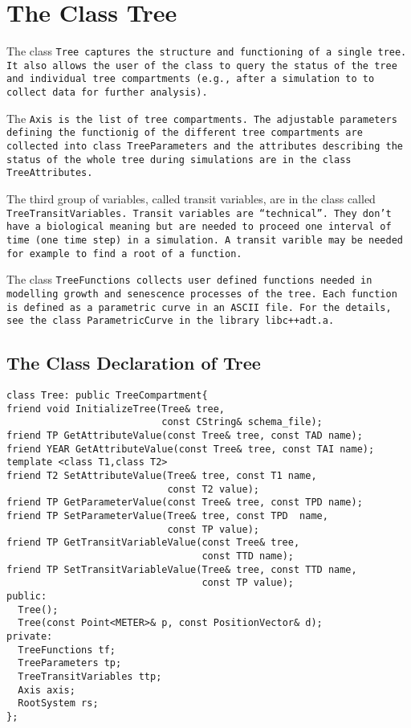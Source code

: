 \section{The Class Tree}

The class \tt Tree \rm captures the structure and 
functioning of a single tree. It also allows the user of the class
to query the status of the tree and individual tree
compartments (e.g., after a simulation to to collect data 
for further analysis).

The \tt Axis \rm is the list of tree compartments. 
The adjustable parameters defining the functionig of the different  
tree compartments are collected into  class \tt TreeParameters \rm 
and the attributes describing the status of the whole  tree 
during simulations are in the class \tt TreeAttributes\rm. 

The third group of variables, called transit
variables, are in the class called \tt TreeTransitVariables\rm. 
Transit variables are ``technical''. They don't have a
biological meaning but are needed to proceed one interval of time
(one time step) in a simulation. A transit varible may be needed
for example to find a root of a function.

The class \tt TreeFunctions \rm collects user defined functions needed
in modelling growth and senescence processes of the tree. Each
function is defined as a parametric curve in an ASCII file. 
For the details, see the class \tt ParametricCurve \rm in the library 
\tt libc++adt.a\rm.

\subsection{The Class Declaration of Tree}
\begin{verbatim}
class Tree: public TreeCompartment{
friend void InitializeTree(Tree& tree, 
                           const CString& schema_file);
friend TP GetAttributeValue(const Tree& tree, const TAD name);
friend YEAR GetAttributeValue(const Tree& tree, const TAI name);
template <class T1,class T2>
friend T2 SetAttributeValue(Tree& tree, const T1 name, 
                            const T2 value);
friend TP GetParameterValue(const Tree& tree, const TPD name);
friend TP SetParameterValue(Tree& tree, const TPD  name, 
                            const TP value);
friend TP GetTransitVariableValue(const Tree& tree, 
                                  const TTD name);
friend TP SetTransitVariableValue(Tree& tree, const TTD name, 
                                  const TP value);
public:
  Tree();
  Tree(const Point<METER>& p, const PositionVector& d);
private:
  TreeFunctions tf;
  TreeParameters tp;
  TreeTransitVariables ttp;
  Axis axis;
  RootSystem rs;
};
\end{verbatim}

